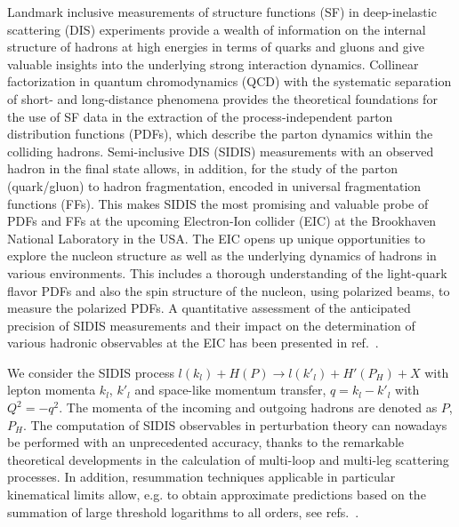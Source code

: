 \documentclass[%
 twocolumn,
 superscriptaddress,
 preprintnumbers,
 nofootinbib,
 amsmath,amssymb,
 aps,
 prl,
]{revtex4}
\begin{document}
Landmark inclusive measurements of structure functions (SF) in deep-inelastic scattering (DIS) experiments provide
a wealth of information on the internal structure of hadrons at high energies in terms of quarks and gluons and give valuable insights into the underlying strong interaction dynamics. 
Collinear factorization in quantum chromodynamics (QCD) with the systematic separation of short- and long-distance phenomena provides the theoretical foundations for the use of SF data in the extraction of the process-independent parton distribution functions (PDFs), which describe the parton dynamics within the colliding hadrons.
Semi-inclusive DIS (SIDIS) measurements with an observed hadron in the final state allows, in addition, for the study of the parton (quark/gluon) to hadron fragmentation, encoded in universal fragmentation functions (FFs). 
This makes SIDIS the most promising and valuable probe of PDFs and FFs at the upcoming Electron-Ion collider (EIC) at the Brookhaven National Laboratory in the USA.
The EIC opens up unique opportunities to explore the nucleon structure as well as the underlying dynamics of hadrons in various environments.
This includes a thorough understanding of the light-quark flavor PDFs and also the spin structure of the nucleon, using polarized beams, to measure the polarized PDFs.
A quantitative assessment of the anticipated precision of SIDIS measurements and their impact on the determination of various hadronic observables at the EIC has been presented in ref.~\cite{Aschenauer:2019kzf}.

We consider the SIDIS process  
$l(k_l) + H(P) \rightarrow  l({k}'_l) + H'(P_H) + X$
with lepton momenta $k_l$, ${k}'_l$ and space-like momentum transfer, $q={k}_l-{k}'_l$ with $Q^2=-q^2$.
The momenta of the incoming and outgoing hadrons are denoted as $P$, $P_H$.
The computation of SIDIS observables in perturbation theory can nowadays be performed with an unprecedented accuracy, thanks to the remarkable theoretical developments in the calculation of multi-loop and multi-leg scattering processes. 
In addition, resummation techniques applicable in particular kinematical limits allow, e.g. to obtain approximate predictions based on the summation of large threshold logarithms to all orders, see refs.~\cite{Cacciari:2001cw,Anderle:2012rq,Anderle:2013lka,Abele:2021nyo,Abele:2022wuy}.
\end{document}
